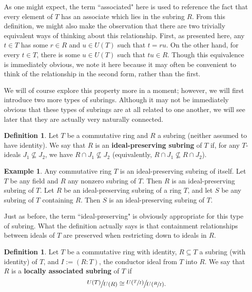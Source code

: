\documentclass[12pt]{amsart}
\theoremstyle{definition}
\newtheorem{example}[theorem]{Example}
\newtheorem{definition}[theorem]{Definition}
\newcommand{\term}[1]{\textbf{\textup{#1}}}
\newcommand{\quot}[2]{\large\sfrac{#1}{#2}\normalsize}
\begin{document}
	As one might expect, the term ``associated" here is used to reference the fact that every element of $T$ has an associate which lies in the subring $R$. From this definition, we might also make the observation that there are two trivially equivalent ways of thinking about this relationship. First, as presented here, any $t\in T$ has some $r\in R$ and $u\in U(T)$ such that $t=ru$. On the other hand, for every $t\in T$, there is some $u\in U(T)$ such that $tu\in R$. Though this equivalence is immediately obvious, we note it here because it may often be convenient to think of the relationship in the second form, rather than the first.
	
	We will of course explore this property more in a moment; however, we will first introduce two more types of subrings. Although it may not be immediately obvious that these types of subrings are at all related to one another, we will see later that they are actually very naturally connected.
	
	\begin{definition}
		Let $T$ be a commutative ring and $R$ a subring (neither assumed to have identity). We say that $R$ is an \term{ideal-preserving subring} of $T$ if, for any $T$-ideals $J_1\nsubseteq J_2$, we have $R\cap J_1\nsubseteq J_2$ (equivalently, $R\cap J_1\nsubseteq R\cap J_2$).
	\end{definition}
	
	\begin{example}
		Any commutative ring $T$ is an ideal-preserving subring of itself. Let $T$ be any field and $R$ any nonzero subring of $T$. Then $R$ is an ideal-preserving subring of $T$. Let $R$ be an ideal-preserving subring of a ring $T$, and let $S$ be any subring of $T$ containing $R$. Then $S$ is an ideal-preserving subring of $T$.
	\end{example}
	
	Just as before, the term ``ideal-preserving" is obviously appropriate for this type of subring. What the definition actually says is that containment relationships between ideals of $T$ are preserved when restricting down to ideals in $R$.
	
	\begin{definition}
		Let $T$ be a commutative ring with identity, $R\subseteq T$ a subring (with identity) of $T$, and $I:=(R:T)$, the conductor ideal from $T$ into $R$. We say that $R$ is a \term{locally associated subring} of $T$ if
		$$\quot{U(T)}{U(R)}\cong \quot{U(\sfrac{T}{I})}{U(\sfrac{R}{I})}.$$
	\end{definition}
	
\end{document}
